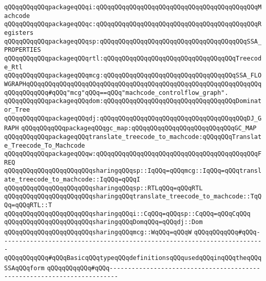 \verb|qQQqqQQqqQQqpackageqQQqi:qQQqqQQqqQQqqQQqqQQqqQQqqQQqqQQqqQQqqQQqqQQqMachcode|\newline
\verb|qQQqqQQqqQQqpackageqQQqc:qQQqqQQqqQQqqQQqqQQqqQQqqQQqqQQqqQQqqQQqqQQqRegisters|\newline
\verb|qQQqqQQqqQQqpackageqQQqsp:qQQqqQQqqQQqqQQqqQQqqQQqqQQqqQQqqQQqqQQqSSA_PROPERTIES|\newline
\verb|qQQqqQQqqQQqpackageqQQqrtl:qQQqqQQqqQQqqQQqqQQqqQQqqQQqqQQqqQQqTreecode_Rtl|\newline
\verb|qQQqqQQqqQQqpackageqQQqmcg:qQQqqQQqqQQqqQQqqQQqqQQqqQQqqQQqqQQqSSA_FLOWGRAPHqQQqqQQqqQQqqQQqqQQqqQQqqQQqqQQqqQQqqQQqqQQqqQQqqQQqqQQqqQQqqQQqqQQqqQQqqQQq#qQQq"mcg"qQQq==qQQq"machcode_controlflow_graph".|\newline
\verb|qQQqqQQqqQQqpackageqQQqdom:qQQqqQQqqQQqqQQqqQQqqQQqqQQqqQQqqQQqDominator_Tree|\newline
\verb|qQQqqQQqqQQqpackageqQQqdj:qQQqqQQqqQQqqQQqqQQqqQQqqQQqqQQqqQQqqQQqDJ_GRAPH|\newline
\verb|qQQqqQQqqQQqpackageqQQqgc_map:qQQqqQQqqQQqqQQqqQQqqQQqqQQqGC_MAP|\newline
\verb|qQQqqQQqqQQqpackageqQQqtranslate_treecode_to_machcode:qQQqqQQqTranslate_Treecode_To_Machcode|\newline
\verb|qQQqqQQqqQQqpackageqQQqw:qQQqqQQqqQQqqQQqqQQqqQQqqQQqqQQqqQQqqQQqqQQqFREQ|\newline
\verb|qQQqqQQqqQQqqQQqqQQqqQQqsharingqQQqsp::IqQQq=qQQqmcg::IqQQq=qQQqtranslate_treecode_to_machcode::IqQQq=qQQqI|\newline
\verb|qQQqqQQqqQQqqQQqqQQqqQQqsharingqQQqsp::RTLqQQq=qQQqRTL|\newline
\verb|qQQqqQQqqQQqqQQqqQQqqQQqsharingqQQqtranslate_treecode_to_machcode::TqQQq=qQQqRTL::T|\newline
\verb|qQQqqQQqqQQqqQQqqQQqqQQqsharingqQQqi::CqQQq=qQQqsp::CqQQq=qQQqCqQQq|\newline
\verb|qQQqqQQqqQQqqQQqqQQqqQQqsharingqQQqDomqQQq=qQQqdj::Dom|\newline
\verb|qQQqqQQqqQQqqQQqqQQqqQQqsharingqQQqmcg::WqQQq=qQQqW|\newline
\newline
\verb|qQQqqQQqqQQq#qQQq------------------------------------------------------------------------|\newline
\verb|qQQqqQQqqQQq#qQQqBasicqQQqtypeqQQqdefinitionsqQQqusedqQQqinqQQqtheqQQqSSAqQQqform|\newline
\verb|qQQqqQQqqQQq#qQQq------------------------------------------------------------------------|\newline
